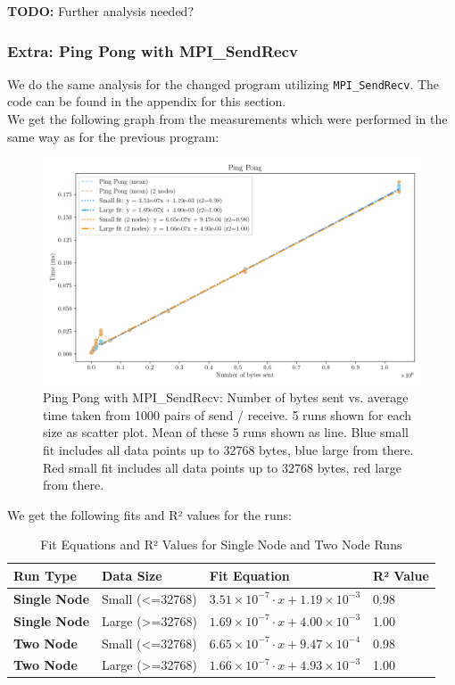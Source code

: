 \textbf{TODO: }
Further analysis needed? 

\subsubsection*{Extra: Ping Pong with MPI\_SendRecv}
We do the same analysis for the changed program utilizing \texttt{MPI\_SendRecv}. The code can be found in the appendix for this section. \\
We get the following graph from the measurements which were performed in the same way as for the previous program:
\begin{figure}[H]
    \centering
    \includegraphics[width=\textwidth]{../fig/lab0/pingPongSR.png}
    \caption{Ping Pong with MPI\_SendRecv: Number of bytes sent vs. average time taken from 1000 pairs of send / receive. 5 runs shown for each size as scatter plot. Mean of these 5 runs shown as line. Blue small fit includes all data points up to 32768 bytes, blue large from there. Red small fit includes all data points up to 32768 bytes, red large from there.}
    \label{fig:pingpongSendRecv}
\end{figure}

We get the following fits and R² values for the runs:
\begin{table}[h!]
    \centering
    \begin{tabular}{|l|l|l|l|}
        \hline
        \textbf{Run Type}   & \textbf{Data Size} & \textbf{Fit Equation}                                      & \textbf{R² Value} \\ \hline
        \textbf{Single Node} & Small (<=32768)  & $3.51 \times 10^{-7} \cdot x + 1.19 \times 10^{-3}$        & 0.98              \\ \hline
        \textbf{Single Node} & Large (>=32768)  & $1.69 \times 10^{-7} \cdot x + 4.00 \times 10^{-3}$        & 1.00              \\ \hline
        \textbf{Two Node}    & Small (<=32768)  & $6.65 \times 10^{-7} \cdot x + 9.47 \times 10^{-4}$        & 0.98              \\ \hline
        \textbf{Two Node}    & Large (>=32768)  & $1.66 \times 10^{-7} \cdot x + 4.93 \times 10^{-3}$        & 1.00              \\ \hline
    \end{tabular}
    \caption{Fit Equations and R² Values for Single Node and Two Node Runs}
\end{table}

